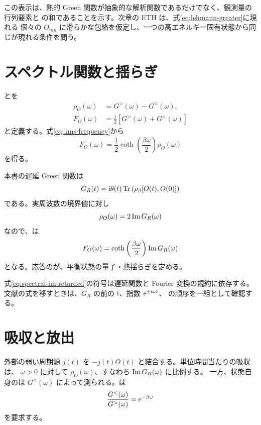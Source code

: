 この表示は、熱的 Green 関数が抽象的な解析関数であるだけでなく、観測量の行列要素と
の和であることを示す。次章の ETH は、式\eqref{eq:lehmann-greater}に現れる
個々の $O_{mn}$ に滑らかな包絡を仮定し、一つの高エネルギー固有状態から同じが現れる条件を問う。

\section{スペクトル関数と揺らぎ}

とを
\begin{align}
\rho_O(\omega)
&=
G^>(\omega)-G^<(\omega),
\label{eq:thermal-spectral-density}
\\
F_O(\omega)
&=
\frac{1}{2}
\left[
G^>(\omega)+G^<(\omega)
\right]
\label{eq:thermal-symmetric-density}
\end{align}
と定義する。式\eqref{eq:kms-frequency}から
\begin{equation}
F_O(\omega)
=
\frac{1}{2}
\coth\left(\frac{\beta\omega}{2}\right)
\rho_O(\omega)
\label{eq:fdt-rho}
\end{equation}
を得る。

本書の遅延 Green 関数は
\begin{equation}
G_R(t)
=
\mathrm{i}\theta(t)
\operatorname{Tr}\left(
\rho_\beta[O(t),O(0)]
\right)
\end{equation}
である。実周波数の境界値に対し
\begin{equation}
\rho_O(\omega)
=
2\operatorname{Im} G_R(\omega)
\label{eq:spectral-im-retarded}
\end{equation}
なので、は
\begin{equation}
F_O(\omega)
=
\coth\left(\frac{\beta\omega}{2}\right)
\operatorname{Im} G_R(\omega)
\label{eq:fluctuation-dissipation}
\end{equation}
となる。応答のが、平衡状態の量子・熱揺らぎを定める。

\begin{warningbox}
式\eqref{eq:spectral-im-retarded}の符号は遅延関数と Fourier 変換の規約に依存する。
文献の式を移すときは、$G_R$ の前の $\mathrm{i}$、指数 $\mathrm{e}^{\pm\mathrm{i}\omega t}$、
の順序を一組として確認する。
\end{warningbox}

\section{吸収と放出}

外部の弱い周期源 $j(t)$ を $-j(t)O(t)$ と結合する。単位時間当たりの吸収は、
$\omega>0$ に対して $\rho_O(\omega)$、すなわち $\operatorname{Im} G_R(\omega)$ に比例する。
一方、状態自身のは $G^<(\omega)$ によって測られる。は
\begin{equation}
\frac{G^<(\omega)}{G^>(\omega)}
=
\mathrm{e}^{-\beta\omega}
\label{eq:detailed-balance-ratio}
\end{equation}
を要求する。

